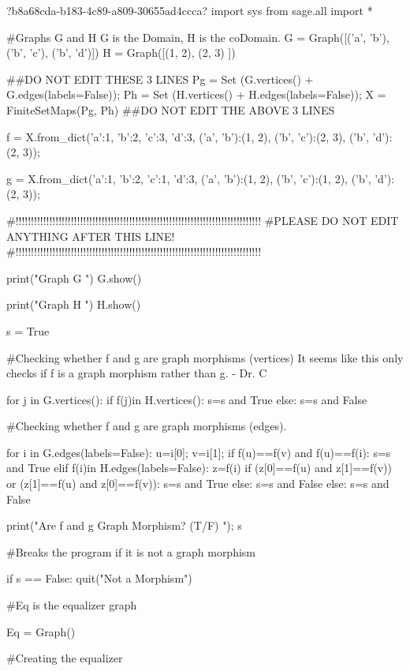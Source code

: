 \documentclass{ximera}
\begin{document}
\begin{sageCell}
?b8a68cda-b183-4c89-a809-30655ad4ccca?
import sys
from sage.all import *

#Graphs G and H  G is the Domain, H is the coDomain.
G = Graph([('a', 'b'),('b', 'c'), ('b', 'd')])
H = Graph([(1, 2), (2, 3) ])

##DO NOT EDIT THESE 3 LINES
Pg = Set (G.vertices() + G.edges(labels=False));
Ph = Set (H.vertices() + H.edges(labels=False));
X = FiniteSetMaps(Pg, Ph)
##DO NOT EDIT THE ABOVE 3 LINES


f = X.from_dict({'a':1, 'b':2, 'c':3, 'd':3, ('a', 'b'):(1, 2), ('b', 'c'):(2, 3), ('b', 'd'):(2, 3)}); 


g = X.from_dict({'a':1, 'b':2, 'c':1, 'd':3, ('a', 'b'):(1, 2), ('b', 'c'):(1, 2), ('b', 'd'):(2, 3)}); 



#!!!!!!!!!!!!!!!!!!!!!!!!!!!!!!!!!!!!!!!!!!!!!!!!!!!!!!!!!!!!!!!!!!!!!!!!!!!!!!!!
#PLEASE DO NOT EDIT ANYTHING AFTER THIS LINE!
#!!!!!!!!!!!!!!!!!!!!!!!!!!!!!!!!!!!!!!!!!!!!!!!!!!!!!!!!!!!!!!!!!!!!!!!!!!!!!!!!

print("\n\n Graph G \n")
G.show()



print("\n\n Graph H \n\n")
H.show()


s = True

#Checking whether f and g are graph morphisms (vertices) It seems like this only checks if f is a graph morphism rather than g. - Dr. C

for j in G.vertices():
    if f(j)in H.vertices():
        s=s and True
    else:
        s=s and False


#Checking whether f and g are graph morphisms (edges).

for i in G.edges(labels=False):
    u=i[0];
    v=i[1];
    if f(u)==f(v) and f(u)==f(i):
        s=s and True
    elif f(i)in H.edges(labels=False):
        z=f(i)
        if (z[0]==f(u) and z[1]==f(v)) or (z[1]==f(u) and z[0]==f(v)):
            s=s and True
        else:
            s=s and False
    else: s=s and False

print("\n\n Are f and g Graph Morphism? (T/F) \n\n"); s


#Breaks the program if it is not a graph morphism

if s == False:
   quit("Not a Morphism")

#Eq is the equalizer graph

Eq = Graph()

#Creating the equalizer



\end{sageCell}
\end{document}
